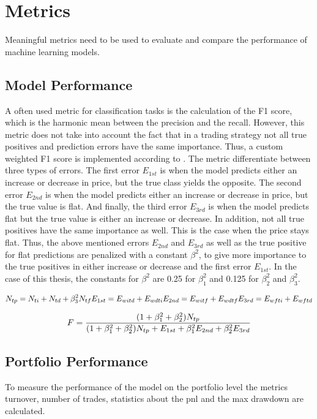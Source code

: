 \section{Metrics}
\label{sec:Metrics}
Meaningful metrics need to be used to evaluate and compare the performance of machine learning models. 


\subsection{Model Performance}
\label{sub:Model_Performance}
A often used metric for classification tasks is the calculation of the F1 score, which is the harmonic mean between the precision and the recall. However, this metric does not take into account the fact that in a trading strategy not all true positives and prediction errors have the same importance. Thus, a custom weighted F1 score is implemented according to \cite{wang2018financial}. The metric differentiate between three types of errors. The first error $E_{1st}$ is when the model predicts either an increase or decrease in price, but the true class yields the opposite. The second error $E_{2nd}$ is when the model predicts either an increase or decrease in price, but the true value is flat. And finally, the third error $E_{3rd}$ is when the model predicts flat but the true value is either an increase or decrease. In addition, not all true positives have the same importance as well. This is the case when the price stays flat. Thus, the above mentioned errors $E_{2nd}$ and $E_{3rd}$ as well as the true positive for flat predictions are penalized with a constant $\beta^2$, to give more importance to the true positives in either increase or decrease and the first error $E_{1st}$. In the case of this thesis, the constants for $\beta^2$ are 0.25 for $\beta_1^2$ and 0.125 for $\beta_2^2$ and $\beta_3^2$.

\begin{equation}
    \centering
    N_{tp} = N_{ti} + N_{td} + \beta_3^2 N_{tf}
    E_{1st} = E_{witd} + E_{wdti}
    E_{2nd} = E_{witf} + E_{wdtf}
    E_{3rd} = E_{wfti} + E_{wftd}
    \label{eq:compute_variables_f1}
\end{equation}

\begin{equation}
    \centering
    F = \frac{(1+\beta_1^2+\beta_2^2) N_{tp}}{(1+\beta_1^2 + \beta_2^2) N_{tp} + E_{1st} + \beta_1^2 E_{2nd} + \beta_2^2 E_{3rd}}
    \label{eq:compute_weighted_f1}
\end{equation}

\subsection{Portfolio Performance}
\label{sub:Portfolio_Performance}
To measure the performance of the model on the portfolio level the metrics turnover, number of trades, statistics about the \gls{pnl} and the max drawdown are calculated.